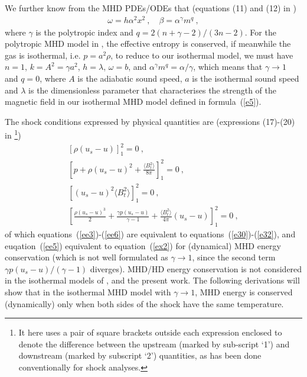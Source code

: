 \documentclass[fleqn,usenatbib]{mnras}
\begin{document}
We further know from the MHD PDEs/ODEs that (equations (11) and (12) in \citet{wang2008dynamic}) 
\begin{gather}
\omega=h\alpha^{2}x^{2}\ ,\quad \beta=\alpha^{\gamma}m^{q}\ ,\label{ee2}
\end{gather}
where $\gamma$ is the polytropic index and $q=2(n+\gamma-2)/(3n-2)$. For the polytropic MHD model in \citet{wang2008dynamic}, the effective entropy is conserved, if meanwhile the gas is isothermal, i.e. $p=a^{2}\rho$, to reduce to our isothermal model, we must have $n=1$, $k=A^{2}=\gamma a^{2}$, $h=\lambda$, $\omega=b$, and $\alpha^{\gamma}m^{q}=\alpha/\gamma$, which means that $\gamma\rightarrow 1$ and $q=0$, where $A$ is the adiabatic sound speed, $a$ is the isothermal sound speed and $\lambda$ is the dimensionless parameter that characterises the strength of the magnetic field in our isothermal MHD model defined in formula~(\ref{e5}).

The shock conditions expressed by physical quantities are (expressions (17)-(20) in \citet{wang2008dynamic}\footnote{It here uses a pair of square brackets outside each expression enclosed to denote the difference between the upstream (marked by sub-script `1') and downstream (marked by subscript `2') quantities, as has been done conventionally for shock analyses.})
\begin{gather}
\left[\rho\left(u_{s}-u\right)\right]_{1}^{2}=0\ ,\label{ee3}\\
\left[p+\rho\left(u_{s}-u\right)^{2}+\frac{\langle B_{t}^{2}\rangle}{8\pi}\right]_{1}^{2}=0\ ,\label{ee4}\\
\left[\left(u_{s}-u\right)^{2}\langle B_{t}^{2}\rangle\right]_{1}^{2}=0\ ,\label{ee6}\\
\left[\frac{\rho\left(u_{s}-u\right)^{3}}{2}+\frac{\gamma p\left(u_{s}-u\right)}{\gamma-1}+\frac{\langle B_{t}^{2}\rangle}{4\pi}\left(u_{s}-u\right)\right]_{1}^{2}=0\ ,\label{ee5}
\end{gather}
of which equations~(\ref{ee3})-(\ref{ee6}) are equivalent to equations~(\ref{e30})-(\ref{e32}), and euqation~(\ref{ee5}) equivalent to equation~(\ref{ex2}) for (dynamical) MHD energy conservation (which is not well formulated as $\gamma\rightarrow 1$, since the second term $\gamma p\left(u_{s}-u\right)/(\gamma-1)$ diverges). MHD/HD energy conservation is not considered in the isothermal models of \citet{lou2014self}, \citet{yuLou2006} and the present work. The following derivations will show that in the isothermal MHD model with $\gamma\rightarrow 1$, MHD energy is conserved (dynamically) only when both sides of the shock have the same temperature.
\end{document}
